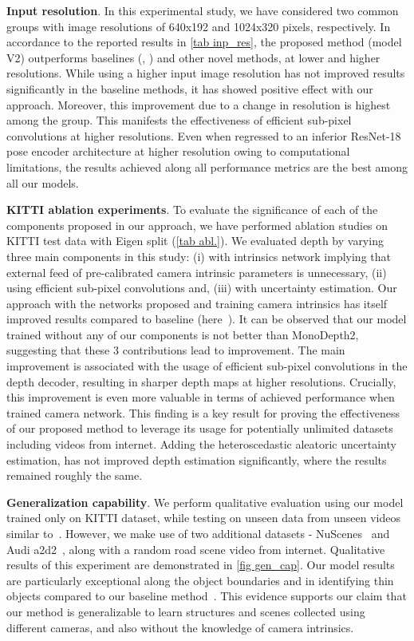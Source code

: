 \documentclass{bmvc2k}
\begin{document}
\textbf{Input resolution}. In this experimental study, we have considered two common groups with image resolutions of 640x192 and 1024x320 pixels, respectively. In accordance to the reported results in \autoref{tab inp_res}, the proposed method (model V2) outperforms baselines (\cite{godard2019digging}, \cite{tosi2020distilled}) and other novel methods, at lower and higher resolutions. While using a higher input image resolution has not improved results significantly in the baseline methods, it has showed positive effect with our approach. Moreover, this improvement due to a change in resolution is highest among the group. This manifests the effectiveness of efficient sub-pixel convolutions at higher resolutions. Even when regressed to an inferior ResNet-18 pose encoder architecture at higher resolution owing to computational limitations, the results achieved along all performance metrics are the best among all our models.

\textbf{KITTI ablation experiments}. To evaluate the significance of each of the components proposed in our approach, we have performed ablation studies on KITTI test data with Eigen split (\autoref{tab abl.}). We evaluated depth by varying three main components in this study: (i) with intrinsics network implying that external feed of pre-calibrated camera intrinsic parameters is unnecessary, (ii) using efficient sub-pixel convolutions and, (iii) with uncertainty estimation. Our approach with the networks proposed and training camera intrinsics has itself improved results compared to baseline (here~\cite{godard2019digging}). It can be observed that our model trained without any of our components is not better than MonoDepth2, suggesting that these $3$ contributions lead to improvement. The main improvement is associated with the usage of efficient sub-pixel convolutions in the depth decoder, resulting in sharper depth maps at higher resolutions. Crucially, this improvement is even more valuable in terms of achieved performance when trained camera network. This finding is a key result for proving the effectiveness of our proposed method to leverage its usage for potentially unlimited datasets including videos from internet. Adding the heteroscedastic aleatoric uncertainty estimation, has not improved depth estimation significantly, where the results remained roughly the same.


\textbf{Generalization capability}. We perform qualitative evaluation using our model trained only on KITTI dataset, while testing on unseen data from unseen videos similar to~\cite{chen2019self}. However, we make use of two additional datasets - NuScenes~\cite{caesar2020nuscenes} and Audi a2d2~\cite{geyer2020a2d2}, along with a random road scene video from internet. Qualitative results of this experiment are demonstrated in \autoref{fig gen_cap}. Our model results are particularly exceptional along the object boundaries and in identifying thin objects compared to our baseline method~\cite{godard2019digging}. This evidence supports our claim that our method is generalizable to learn structures and scenes collected using different cameras, and also without the knowledge of camera intrinsics.
\end{document}
